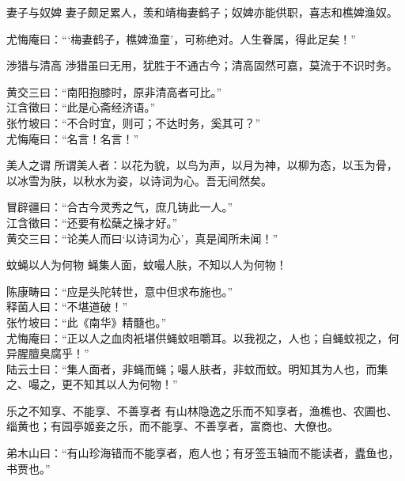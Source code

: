\begin{yulu}{妻子与奴婢}
妻子颇足累人，羡和靖梅妻鹤子；奴婢亦能供职，喜志和樵婢渔奴。
\begin{comments}
尤悔庵曰：“‘梅妻鹤子，樵婢渔童’，可称绝对。人生眷属，得此足矣！”
\end{comments}
\end{yulu}

\begin{yulu}{渉猎与清高}
渉猎虽曰无用，犹胜于不通古今；清高固然可嘉，莫流于不识时务。
\begin{comments}
黄交三曰：“南阳抱膝时，原非清高者可比。” \\
江含徵曰：“此是心斋经济语。” \\
张竹坡曰：“不合时宜，则可；不达时务，奚其可？” \\
尤悔庵曰：“名言！名言！”
\end{comments}
\end{yulu}

\begin{yulu}{美人之谓}
所谓美人者：以花为貌，以鸟为声，以月为神，以柳为态，以玉为骨，以冰雪为肤，以秋水为姿，以诗词为心。吾无间然矣。
\begin{comments}
冒辟疆曰：“合古今灵秀之气，庶几铸此一人。” \\
江含徵曰：“还要有松蘖之操才好。” \\
黄交三曰：“论美人而曰‘以诗词为心’，真是闻所未闻！”
\end{comments}
\end{yulu}

\begin{yulu}{蚊蝇以人为何物}
蝇集人面，蚊嘬人肤，不知以人为何物！
\begin{comments}
陈康畴曰：“应是头陀转世，意中但求布施也。” \\
释菌人曰：“不堪道破！” \\
张竹坡曰：“此《南华》精髓也。” \\
尤悔庵曰：“正以人之血肉衹堪供蝇蚊咀嚼耳。以我视之，人也；自蝇蚊视之，何异腥膻臭腐乎！” \\
陆云士曰：“集人面者，非蝇而蝇；嘬人肤者，非蚊而蚊。明知其为人也，而集之、嘬之，更不知其以人为何物！”
\end{comments}
\end{yulu}

\begin{yulu}{乐之不知享、不能享、不善享者}
有山林隐逸之乐而不知享者，渔樵也、农圃也、缁黄也；有园亭姬妾之乐，而不能享、不善享者，富商也、大僚也。
\begin{comments}
弟木山曰：“有山珍海错而不能享者，庖人也；有牙签玉轴而不能读者，蠹鱼也，书贾也。”
\end{comments}
\end{yulu}

